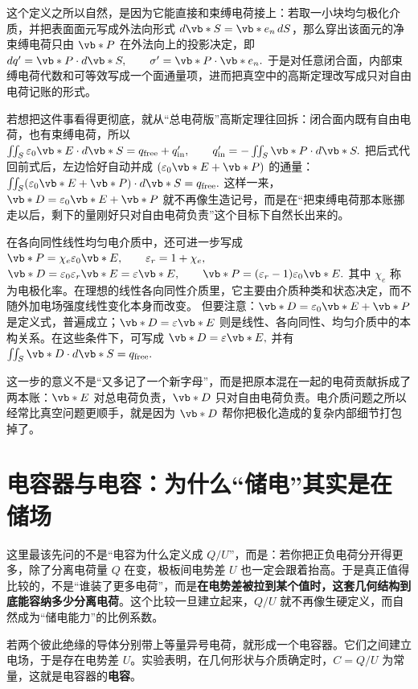 \documentclass[lang=cn,11pt]{elegantbook}
\newcommand{\bridge}[1]{\begin{note}#1\end{note}}
\begin{document}
这个定义之所以自然，是因为它能直接和束缚电荷接上：若取一小块均匀极化介质，并把表面面元写成外法向形式 \(d\vb*{S}=\vb*{e}_n\,dS\)，那么穿出该面元的净束缚电荷只由 \(\vb*{P}\) 在外法向上的投影决定，即
 \(dq'=\vb*{P}\cdot d\vb*{S}, \qquad \sigma'=\vb*{P}\cdot \vb*{e}_n.\) 
于是对任意闭合面，内部束缚电荷代数和可等效写成一个面通量项，进而把真空中的高斯定理改写成只对自由电荷记账的形式。

\bridge{若想把这件事看得更彻底，就从“总电荷版”高斯定理往回拆：闭合面内既有自由电荷，也有束缚电荷，所以 \(\iint_S \varepsilon_0\vb*{E}\cdot d\vb*{S} =q_{\mathrm{free}}+q'_{\mathrm{in}}, \qquad q'_{\mathrm{in}}=-\iint_S \vb*{P}\cdot d\vb*{S}.\) 把后式代回前式后，左边恰好自动并成 \((\varepsilon_0\vb*{E}+\vb*{P})\) 的通量：\(\iint_S (\varepsilon_0\vb*{E}+\vb*{P})\cdot d\vb*{S}=q_{\mathrm{free}}.\) 这样一来，\(\vb*{D}=\varepsilon_0\vb*{E}+\vb*{P}\) 就不再像生造记号，而是在“把束缚电荷那本账挪走以后，剩下的量刚好只对自由电荷负责”这个目标下自然长出来的。}

在各向同性线性均匀电介质中，还可进一步写成
 \(\vb*{P}=\chi_e\varepsilon_0\vb*{E}, \qquad \varepsilon_r=1+\chi_e,\) 
 \(\vb*{D}=\varepsilon_0\varepsilon_r\vb*{E}=\varepsilon\vb*{E}, \qquad \vb*{P}=(\varepsilon_r-1)\varepsilon_0\vb*{E}.\) 
其中 \(\chi_e\) 称为电极化率。在理想的线性各向同性介质里，它主要由介质种类和状态决定，而不随外加电场强度线性变化本身而改变。
但要注意：\(\vb*{D}=\varepsilon_0\vb*{E}+\vb*{P}\) 是定义式，普遍成立；\(\vb*{D}=\varepsilon\vb*{E}\) 则是线性、各向同性、均匀介质中的本构关系。在这些条件下，可写成
 \(\vb*{D}=\varepsilon \vb*{E},\) 
并有
 \(\iint_S \vb*{D}\cdot d\vb*{S}=q_{\mathrm{free}}.\) 

\bridge{这一步的意义不是“又多记了一个新字母”，而是把原本混在一起的电荷贡献拆成了两本账：\(\vb*{E}\) 对总电荷负责，\(\vb*{D}\) 只对自由电荷负责。电介质问题之所以经常比真空问题更顺手，就是因为 \(\vb*{D}\) 帮你把极化造成的复杂内部细节打包掉了。}

\section{电容器与电容：为什么“储电”其实是在储场}

这里最该先问的不是“电容为什么定义成 \(Q/U\)”，而是：若你把正负电荷分开得更多，除了分离电荷量 \(Q\) 在变，极板间电势差 \(U\) 也一定会跟着抬高。于是真正值得比较的，不是“谁装了更多电荷”，而是\textbf{在电势差被拉到某个值时，这套几何结构到底能容纳多少分离电荷}。这个比较一旦建立起来，\(Q/U\) 就不再像生硬定义，而自然成为“储电能力”的比例系数。

若两个彼此绝缘的导体分别带上等量异号电荷，就形成一个电容器。它们之间建立电场，于是存在电势差 \(U\)。实验表明，在几何形状与介质确定时，\(C=Q/U\) 为常量，这就是电容器的\textbf{电容}。
\end{document}
